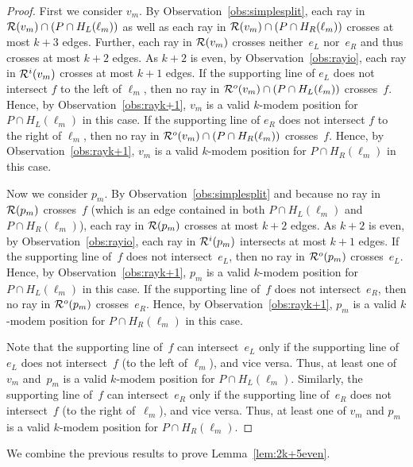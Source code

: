 \documentclass[A4]{article}
\begin{document}
\begin{proof}
First we consider $v_m$.
By Observation~\ref{obs:simplesplit}, each ray in ${\cal R}(v_m)\cap( P\cap H_L(\ell_{m}) )$ as well as each ray in ${\cal R}(v_m)\cap( P\cap H_R(\ell_{m}) )$ crosses at most $k+3$ edges.
Further, each ray in ${\cal R}(v_m)$ crosses neither~$e_L$ nor~$e_R$ and thus crosses at most $k+2$ edges.
As $k+2$ is even, by Observation~\ref{obs:rayio}, each ray in ${\cal R}^i(v_m)$ crosses at most $k+1$ edges.
If the supporting line of $e_L$ does not intersect $f$ to the left of $\ell_m$, then no ray in ${\cal R}^o(v_m)\cap( P\cap H_L(\ell_{m}) )$ crosses~$f$.
Hence, by Observation~\ref{obs:rayk+1}, $v_m$ is a valid \mbox{$k$-modem} position for $P\cap H_L(\ell_{m})$ in this case.
If the supporting line of $e_R$ does not intersect $f$ to the right of $\ell_m$, then no ray in ${\cal R}^o(v_m)\cap( P\cap H_R(\ell_{m}) )$ crosses~$f$.
Hence, by Observation~\ref{obs:rayk+1}, $v_m$ is a valid \mbox{$k$-modem} position for $P\cap H_R(\ell_{m})$ in this case.


Now we consider $p_m$.
By Observation~\ref{obs:simplesplit} and because no ray in ${\cal R}(p_m)$ crosses~$f$ (which is an edge contained in both $P\cap H_L(\ell_{m})$ and $P\cap H_R(\ell_{m})$), each ray in ${\cal R}(p_m)$ crosses at most $k+2$ edges.
As $k+2$ is even, by Observation~\ref{obs:rayio}, each ray in ${\cal R}^i(p_m)$ intersects at most $k+1$ edges.
If the supporting line of~$f$ does not intersect~$e_L$, then no ray in ${\cal R}^o(p_m)$ crosses~$e_L$.
Hence, by Observation~\ref{obs:rayk+1}, $p_m$ is a valid \mbox{$k$-modem} position for $P\cap H_L(\ell_{m})$ in this case.
If the supporting line of~$f$ does not intersect~$e_R$, then no ray in ${\cal R}^o(p_m)$ crosses~$e_R$.
Hence, by Observation~\ref{obs:rayk+1}, $p_m$ is a valid \mbox{$k$-modem} position for $P\cap H_R(\ell_{m})$ in this case.

Note that the supporting line of~$f$ can intersect~$e_L$ only if the supporting line of~$e_L$ does not intersect~$f$ (to the left of $\ell_m$), and vice versa.
Thus, at least one of~$v_m$ and~$p_m$ is a valid \mbox{$k$-modem} position for $P\cap H_L(\ell_{m})$.
Similarly, the supporting line of~$f$ can intersect~$e_R$ only if the supporting line of~$e_R$ does not intersect~$f$ (to the right of~$\ell_m$), and vice versa.
Thus, at least one of $v_m$ and $p_m$ is a valid \mbox{$k$-modem} position for $P\cap H_R(\ell_{m})$.
\end{proof}

We combine the previous results to prove Lemma~\ref{lem:2k+5even}.
\end{document}
